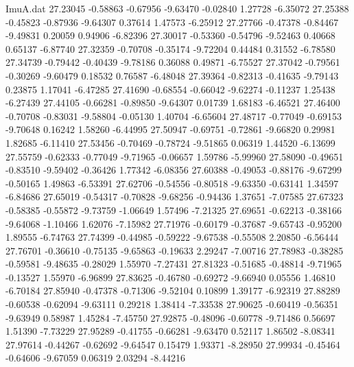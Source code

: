 \begin{filecontents}{ImuA.dat}
  27.23045   -0.58863   -0.67956   -9.63470   -0.02840    1.27728   -6.35072
  27.25388   -0.45823   -0.87936   -9.64307    0.37614    1.47573   -6.25912
  27.27766   -0.47378   -0.84467   -9.49831    0.20059    0.94906   -6.82396
  27.30017   -0.53360   -0.54796   -9.52463    0.40668    0.65137   -6.87740
  27.32359   -0.70708   -0.35174   -9.72204    0.44484    0.31552   -6.78580
  27.34739   -0.79442   -0.40439   -9.78186    0.36088    0.49871   -6.75527
  27.37042   -0.79561   -0.30269   -9.60479    0.18532    0.76587   -6.48048
  27.39364   -0.82313   -0.41635   -9.79143    0.23875    1.17041   -6.47285
  27.41690   -0.68554   -0.66042   -9.62274   -0.11237    1.25438   -6.27439
  27.44105   -0.66281   -0.89850   -9.64307    0.01739    1.68183   -6.46521
  27.46400   -0.70708   -0.83031   -9.58804   -0.05130    1.40704   -6.65604
  27.48717   -0.77049   -0.69153   -9.70648    0.16242    1.58260   -6.44995
  27.50947   -0.69751   -0.72861   -9.66820    0.29981    1.82685   -6.11410
  27.53456   -0.70469   -0.78724   -9.51865    0.06319    1.44520   -6.13699
  27.55759   -0.62333   -0.77049   -9.71965   -0.06657    1.59786   -5.99960
  27.58090   -0.49651   -0.83510   -9.59402   -0.36426    1.77342   -6.08356
  27.60388   -0.49053   -0.88176   -9.67299   -0.50165    1.49863   -6.53391
  27.62706   -0.54556   -0.80518   -9.63350   -0.63141    1.34597   -6.84686
  27.65019   -0.54317   -0.70828   -9.68256   -0.94436    1.37651   -7.07585
  27.67323   -0.58385   -0.55872   -9.73759   -1.06649    1.57496   -7.21325
  27.69651   -0.62213   -0.38166   -9.64068   -1.10466    1.62076   -7.15982
  27.71976   -0.60179   -0.37687   -9.65743   -0.95200    1.89555   -6.74763
  27.74399   -0.44985   -0.59222   -9.67538   -0.55508    2.20850   -6.56444
  27.76701   -0.36610   -0.75135   -9.65863   -0.19633    2.29247   -7.00716
  27.78983   -0.38285   -0.59581   -9.48635   -0.28029    1.55970   -7.27431
  27.81323   -0.51685   -0.48814   -9.71965   -0.13527    1.55970   -6.96899
  27.83625   -0.46780   -0.69272   -9.66940    0.05556    1.46810   -6.70184
  27.85940   -0.47378   -0.71306   -9.52104    0.10899    1.39177   -6.92319
  27.88289   -0.60538   -0.62094   -9.63111    0.29218    1.38414   -7.33538
  27.90625   -0.60419   -0.56351   -9.63949    0.58987    1.45284   -7.45750
  27.92875   -0.48096   -0.60778   -9.71486    0.56697    1.51390   -7.73229
  27.95289   -0.41755   -0.66281   -9.63470    0.52117    1.86502   -8.08341
  27.97614   -0.44267   -0.62692   -9.64547    0.15479    1.93371   -8.28950
  27.99934   -0.45464   -0.64606   -9.67059    0.06319    2.03294   -8.44216

\end{filecontents}
